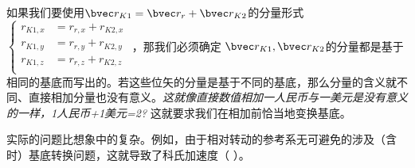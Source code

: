 如果我们要使用$\bvec r_{K1} = \bvec r_{r}+\bvec r_{K2}$的分量形式 
$
\begin{cases}
r_{K1,x}&=r_{r,x}+r_{K2,x}\\
r_{K1,y}&=r_{r,y}+r_{K2,y}\\
r_{K1,z}&=r_{r,z}+r_{K2,z}\\
\end{cases}
$
，那我们必须确定 $\bvec r_{K1}, \bvec r_{K2}$的分量都是基于相同的基底而写出的。若这些位矢的分量是基于不同的基底，那么分量的含义就不同、直接相加分量也没有意义。\textsl{这就像直接数值相加一人民币与一美元是没有意义的一样，1人民币+1美元=2?} 这就要求我们在相加前恰当地变换基底。

实际的问题比想象中的复杂。例如，由于相对转动的参考系无可避免的涉及（含时）基底转换问题，这就导致了科氏加速度（ ）。
